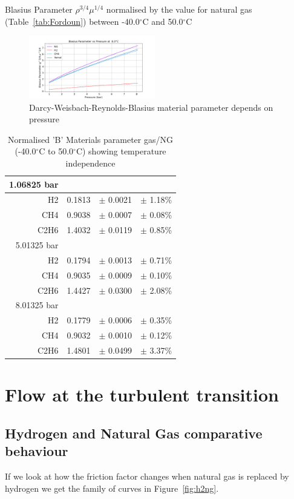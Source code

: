\documentclass[5p]{elsarticle} %
\begin{document}
Blasius Parameter $\rho^{3/4}\mu^{1/4}$ normalised by the value for natural gas (Table~\ref{tab:Fordoun}) between -40.0$^\circ$C and 50.0$^\circ$C

\begin{figure}[htb]
\centering
\includegraphics[width=0.49\textwidth]{peng_bf_p.png}
\caption{Darcy-Weisbach-Reynolds-Blasius material parameter depends on pressure }
\label{fig:blasiuspressure}
\end{figure}

\begin{table}[htb]
\begin{tabular}{r|r|l |l}
\hline
     1.06825 bar \\
\hline
H2       &0.1813 &$\pm$    0.0021&$\pm$   1.18\%\\
CH4      &0.9038 &$\pm$   0.0007&$\pm$  0.08\%\\
C2H6     &1.4032 &$\pm$    0.0119&$\pm$    0.85\%\\
\hline
     5.01325 bar \\
\hline
H2       &0.1794 &$\pm$ 0.0013  &$\pm$ 0.71\%\\
CH4      &0.9035 &$\pm$ 0.0009  &$\pm$ 0.10\%\\
C2H6     &1.4427 &$\pm$ 0.0300 &$\pm$  2.08\%\\
\hline
     8.01325 bar \\
\hline
H2       &0.1779 &$\pm$ 0.0006 &$\pm$  0.35\%\\
CH4      &0.9032 &$\pm$ 0.0010 &$\pm$  0.12\%\\
C2H6     &1.4801 &$\pm$ 0.0499  &$\pm$ 3.37\%\\
\end{tabular}
\caption{\label{tab:bparameter}Normalised 'B' Materials parameter gas/NG (-40.0$^\circ$C to 50.0$^\circ$C) showing temperature independence\citep{Sargents_github}}
\end{table}

\section{Flow at the turbulent transition}
\subsection{Hydrogen and Natural Gas comparative behaviour}
\label{h2ng}
If we look at how the friction factor changes when natural gas is replaced by hydrogen we get the family of curves in Figure~\ref{fig:h2ng}.
\end{document}
